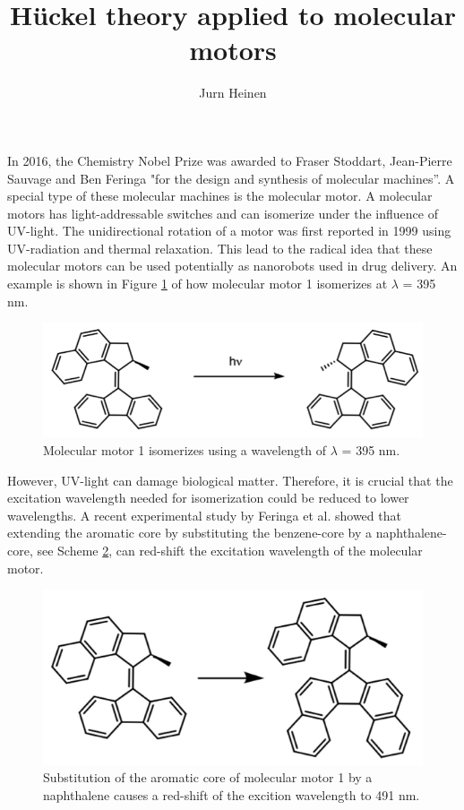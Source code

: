\documentclass{article}
\begin{document}
\title{H\"uckel theory applied to molecular motors}
\author{Jurn Heinen}
\maketitle

In 2016, the Chemistry Nobel Prize was awarded to Fraser Stoddart, Jean-Pierre Sauvage and Ben Feringa "for the design and synthesis of molecular machines”.\cite{nobelprizechemistry2016} A special type of these molecular machines is the molecular motor. A molecular motors has light-addressable switches and can isomerize under the influence of UV-light.\cite{Feringa2012} The unidirectional rotation of a motor was first reported in 1999 using UV-radiation and thermal relaxation.\cite{Koumura1999} This lead to the radical idea that these molecular motors can be used potentially as nanorobots used in drug delivery. An example is shown in Figure \ref{fig:mm1} of how molecular motor 1 isomerizes at $\lambda$ = 395 nm.

\begin{figure}[h]
\centering
\includegraphics[scale=0.75]{./images/scheme1.png}
\caption{Molecular motor 1 isomerizes using a wavelength of $\lambda$ = 395 nm.}
\label{fig:mm1}
\end{figure} 

However, UV-light can damage biological matter. Therefore, it is crucial that the excitation wavelength needed for isomerization could be reduced to lower wavelengths. A recent experimental study by Feringa et al. showed that extending the aromatic core by substituting the benzene-core by a naphthalene-core, see Scheme \ref{fig:mm2}, can red-shift the excitation wavelength of the molecular motor.\cite{VanLeeuwen2017} 

\begin{figure}[h]
\centering
\includegraphics[scale=0.75]{./images/scheme2.png}
\caption{Substitution of the aromatic core of molecular motor 1 by a naphthalene causes a red-shift of the excition wavelength to 491 nm.}
\label{fig:mm2}
\end{figure} 
\end{document}
